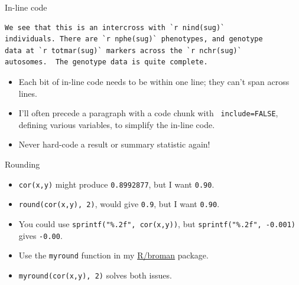 \documentclass[12pt,t]{beamer}
\newcommand{\hilit}{\color{hilit}}
\newcommand{\vhilit}{\color{vhilit}}
\newcommand{\bi}{\begin{itemize}}
\newcommand{\ei}{\end{itemize}}
\begin{document}
\begin{frame}[fragile]{In-line code}

\vspace{24pt}

\begin{lstlisting}
We see that this is an intercross with `r nind(sug)` 
individuals. There are `r nphe(sug)` phenotypes, and genotype
data at `r totmar(sug)` markers across the `r nchr(sug)`
autosomes.  The genotype data is quite complete.
\end{lstlisting}

\vfill

\bi
\itemsep12pt
\item Each bit of in-line code needs to be within one line; they can't
  span across lines.
\item I'll often precede a paragraph with a code chunk with {\tt
  include=FALSE}, defining various variables, to simplify the in-line
  code.
\item Never hard-code a result or summary statistic again!
\ei

\end{frame}


\begin{frame}{Rounding}

\vspace{24pt}

\bi
\itemsep18pt
\item {\tt cor(x,y)} might produce {\tt \vhilit 0.8992877}, but
I want {\tt \hilit 0.90}.

\item {\tt round(cor(x,y), 2)}, would give {\tt \vhilit 0.9}, but I want 
{\tt \hilit 0.90}.

\item You could use {\tt sprintf("\%.2f", cor(x,y))}, but
{\tt sprintf("\%.2f", -0.001)} gives {\tt \vhilit -0.00}.

\item Use the {\tt myround} function in my
\href{http://github.com/kbroman/broman}{R/broman} package.

\item {\tt myround(cor(x,y), 2)} solves both issues.
\ei

\end{frame}
\end{document}
